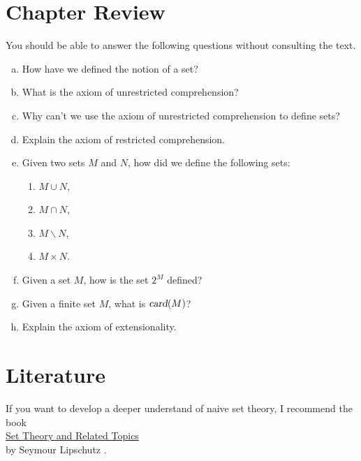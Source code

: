 \section{Chapter Review}
You should be able to answer the following questions without consulting the text.
\begin{enumerate}[(a)]
\item How have we defined the notion of a set?
\item What is the axiom of unrestricted comprehension?  
\item Why can't we use the axiom of unrestricted comprehension to define sets?
\item Explain the axiom of restricted comprehension.
\item Given two sets $M$ and $N$, how did we define the following sets:
      \begin{enumerate}
      \item $M \cup N$,
      \item $M \cap N$,
      \item $M \backslash N$,
      \item $M \times N$.
      \end{enumerate}
\item Given a set $M$, how is the set $2^M$ defined?      
\item Given a finite set $M$, what is $\textsl{card}(M)$?
\item Explain the axiom of extensionality.
\end{enumerate}

\section{Literature}
If you want to develop a deeper understand of naive set theory, I recommend the book
\\[0.2cm]
\hspace*{1.3cm}
\href{http://www.google.com/search?q=Set+Theory+and+Related+Topics+pdf}{Set Theory and Related Topics} 
\\[0.2cm]
by Seymour Lipschutz \cite{lipschutz:1998}.

